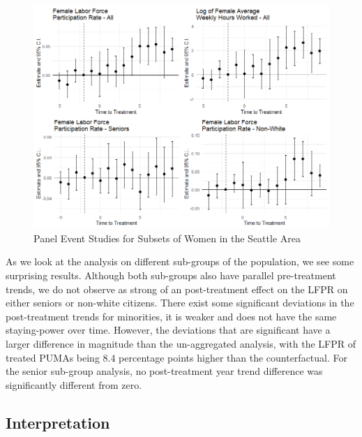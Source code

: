 \documentclass{article}
\begin{document}
\begin{figure}[h]
\caption{Panel Event Studies for Subsets of Women in the Seattle Area}
\label{seattle_dind}
\centering
\includegraphics[width=1.0\textwidth]{Graphs/dynamic_seattle.png}
\end{figure}

As we look at the analysis on different sub-groups of the population, we see some surprising results. Although both sub-groups also have parallel pre-treatment trends, we do not observe as strong of an post-treatment effect on the LFPR on either seniors or non-white citizens. There exist some significant deviations in the post-treatment trends for minorities, it is weaker and does not have the same staying-power over time. However, the deviations that are significant have a larger difference in magnitude than the un-aggregated analysis, with the LFPR of treated PUMAs being 8.4 percentage points higher than the counterfactual. For the senior sub-group analysis, no post-treatment year trend difference was significantly different from zero.\\

\subsection{Interpretation}
\end{document}
